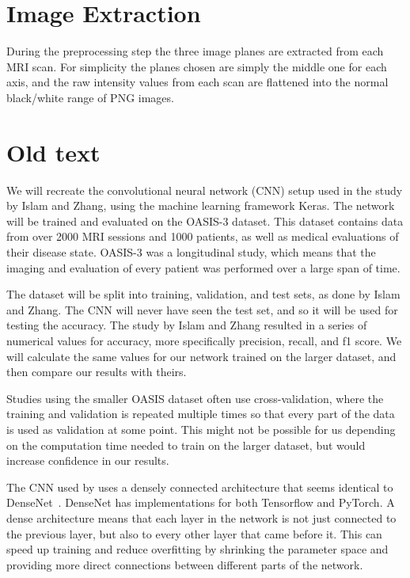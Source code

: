 \documentclass{kththesis}
\begin{document}
\section{Image Extraction}
During the preprocessing step the three image planes are extracted from each MRI scan. For simplicity the planes chosen are simply the middle one for each axis, and the raw intensity values from each scan are flattened into the normal black/white range of PNG images.

\section{Old text}
We will recreate the convolutional neural network (CNN) setup used in the study by Islam and Zhang, using the machine learning framework Keras. The network will be trained and evaluated on the OASIS-3 dataset. This dataset contains data from over 2000 MRI sessions and 1000 patients, as well as medical evaluations of their disease state. OASIS-3 was a longitudinal study, which means that the imaging and evaluation of every patient was performed over a large span of time.

The dataset will be split into training, validation, and test sets, as done by Islam and Zhang. The CNN will never have seen the test set, and so it will be used for testing the accuracy. The study by Islam and Zhang resulted in a series of numerical values for accuracy, more specifically precision, recall, and f1 score. We will calculate the same values for our network trained on the larger dataset, and then compare our results with theirs. 

Studies using the smaller OASIS dataset often use cross-validation, where the training and validation is repeated multiple times so that every part of the data is used as validation at some point. This might not be possible for us depending on the computation time needed to train on the larger dataset, but would increase confidence in our results.

The CNN used by \textcite{islam2018early} uses a densely connected architecture that seems identical to DenseNet~\cite{huang2017densely}. DenseNet has implementations for both Tensorflow and PyTorch. A dense architecture means that each layer in the network is not just connected to the previous layer, but also to every other layer that came before it. This can speed up training and reduce overfitting by shrinking the parameter space and providing more direct connections between different parts of the network.
\end{document}
